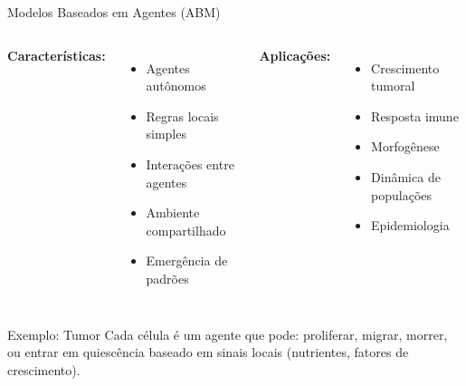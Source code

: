 \begin{frame}{Modelos Baseados em Agentes (ABM)}

\vspace{0.3cm}

\begin{columns}
\textbf{Características:}
\begin{itemize}
    \item Agentes autônomos
    \item Regras locais simples
    \item Interações entre agentes
    \item Ambiente compartilhado
    \item Emergência de padrões
\end{itemize}

\textbf{Aplicações:}
\begin{itemize}
    \item Crescimento tumoral
    \item Resposta imune
    \item Morfogênese
    \item Dinâmica de populações
    \item Epidemiologia
\end{itemize}
\end{columns}

\vspace{0.3cm}

\begin{exampleblock}{Exemplo: Tumor}
Cada célula é um agente que pode: proliferar, migrar, morrer, ou entrar em quiescência baseado em sinais locais (nutrientes, fatores de crescimento).
\end{exampleblock}
\end{frame}

